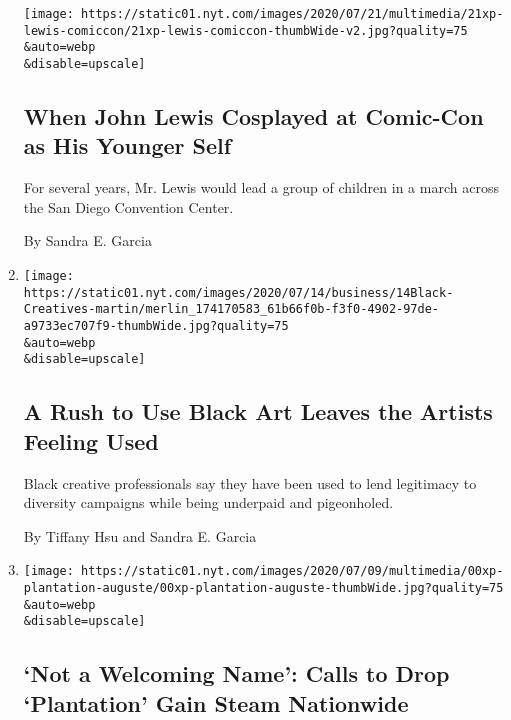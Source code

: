\begin{enumerate}
  \texttt{[image: https://static01.nyt.com/images/2020/07/21/multimedia/21xp-lewis-comiccon/21xp-lewis-comiccon-thumbWide-v2.jpg?quality=75\\\&auto=webp\\\&disable=upscale]}

  \hypertarget{when-john-lewis-cosplayed-at-comic-con-as-his-younger-self}{%
  \subsection{When John Lewis Cosplayed at Comic-Con as His Younger
  Self}\label{when-john-lewis-cosplayed-at-comic-con-as-his-younger-self}}

  For several years, Mr. Lewis would lead a group of children in a march
  across the San Diego Convention Center.

  By Sandra E. Garcia
\item
  \href{/2020/07/20/business/media/black-creatives-protests.html}{}

  \texttt{[image: https://static01.nyt.com/images/2020/07/14/business/14Black-Creatives-martin/merlin\_174170583\_61b66f0b-f3f0-4902-97de-a9733ec707f9-thumbWide.jpg?quality=75\\\&auto=webp\\\&disable=upscale]}

  \hypertarget{a-rush-to-use-black-art-leaves-the-artists-feeling-used}{%
  \subsection{A Rush to Use Black Art Leaves the Artists Feeling
  Used}\label{a-rush-to-use-black-art-leaves-the-artists-feeling-used}}

  Black creative professionals say they have been used to lend
  legitimacy to diversity campaigns while being underpaid and
  pigeonholed.

  By Tiffany Hsu and Sandra E. Garcia
\item
  \href{/2020/07/11/us/plantation-fl-rhode-island.html}{}

  \texttt{[image: https://static01.nyt.com/images/2020/07/09/multimedia/00xp-plantation-auguste/00xp-plantation-auguste-thumbWide.jpg?quality=75\\\&auto=webp\\\&disable=upscale]}

  \hypertarget{not-a-welcoming-name-calls-to-drop-plantation-gain-steam-nationwide}{%
  \subsection{`Not a Welcoming Name': Calls to Drop `Plantation' Gain
  Steam
  Nationwide}\label{not-a-welcoming-name-calls-to-drop-plantation-gain-steam-nationwide}}


\end{enumerate}
